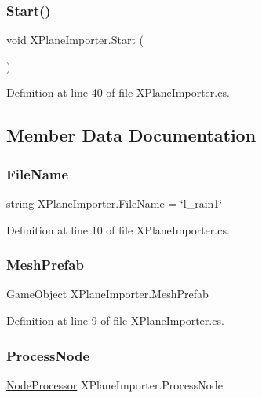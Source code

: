 \subsubsection{\texorpdfstring{Start()}{Start()}}
{\footnotesize\ttfamily void X\+Plane\+Importer.\+Start (\begin{DoxyParamCaption}{ }\end{DoxyParamCaption})}



Definition at line 40 of file X\+Plane\+Importer.\+cs.



\subsection{Member Data Documentation}
\mbox{\label{class_x_plane_importer_ae8898b38e75dfc7d6d6ee161add4067e}} 
\subsubsection{\texorpdfstring{FileName}{FileName}}
{\footnotesize\ttfamily string X\+Plane\+Importer.\+File\+Name = \char`\"{}l\+\_\+rain1\char`\"{}}



Definition at line 10 of file X\+Plane\+Importer.\+cs.

\mbox{\label{class_x_plane_importer_ab6eb4548431610293a67b2dc137fee4d}} 
\subsubsection{\texorpdfstring{MeshPrefab}{MeshPrefab}}
{\footnotesize\ttfamily Game\+Object X\+Plane\+Importer.\+Mesh\+Prefab}



Definition at line 9 of file X\+Plane\+Importer.\+cs.

\mbox{\label{class_x_plane_importer_a2154c9f7703f60cf94bb13f03cfd078c}} 
\subsubsection{\texorpdfstring{ProcessNode}{ProcessNode}}
{\footnotesize\ttfamily \mbox{\hyperlink{class_x_plane_importer_a900a89814a40058c59e1f6c062bf724e}{Node\+Processor}} X\+Plane\+Importer.\+Process\+Node}



